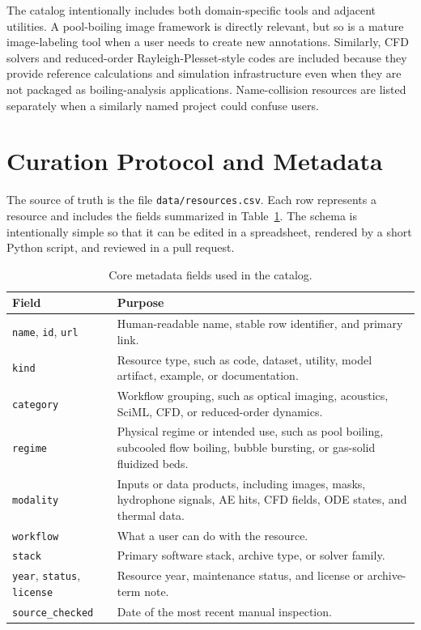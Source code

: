 \documentclass[11pt]{article}
\begin{document}
The catalog intentionally includes both domain-specific tools and adjacent utilities. A pool-boiling image framework is directly relevant, but so is a mature image-labeling tool when a user needs to create new annotations. Similarly, CFD solvers and reduced-order Rayleigh-Plesset-style codes are included because they provide reference calculations and simulation infrastructure even when they are not packaged as boiling-analysis applications. Name-collision resources are listed separately when a similarly named project could confuse users.

\section{Curation Protocol and Metadata}

The source of truth is the file \texttt{data/resources.csv}. Each row represents a resource and includes the fields summarized in Table~\ref{tab:schema}. The schema is intentionally simple so that it can be edited in a spreadsheet, rendered by a short Python script, and reviewed in a pull request.

\begin{table}[t]
\centering
\caption{Core metadata fields used in the catalog.}
\label{tab:schema}
\begin{tabularx}{\linewidth}{@{}lX@{}}
\toprule
Field & Purpose \\
\midrule
\texttt{name}, \texttt{id}, \texttt{url} & Human-readable name, stable row identifier, and primary link. \\
\texttt{kind} & Resource type, such as code, dataset, utility, model artifact, example, or documentation. \\
\texttt{category} & Workflow grouping, such as optical imaging, acoustics, SciML, CFD, or reduced-order dynamics. \\
\texttt{regime} & Physical regime or intended use, such as pool boiling, subcooled flow boiling, bubble bursting, or gas-solid fluidized beds. \\
\texttt{modality} & Inputs or data products, including images, masks, hydrophone signals, AE hits, CFD fields, ODE states, and thermal data. \\
\texttt{workflow} & What a user can do with the resource. \\
\texttt{stack} & Primary software stack, archive type, or solver family. \\
\texttt{year}, \texttt{status}, \texttt{license} & Resource year, maintenance status, and license or archive-term note. \\
\texttt{source\_checked} & Date of the most recent manual inspection. \\
\bottomrule
\end{tabularx}
\end{table}
\end{document}
